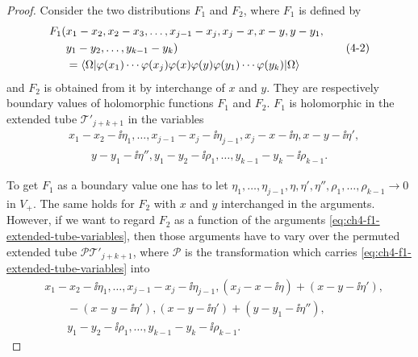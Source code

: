 \begin{proof}

Consider the two distributions $F_1$ and $F_2$, where $F_1$ is defined by
\begin{equation}
\begin{aligned}
 F_1(&x_1-x_2,x_2-x_3,\ldots,x_{j-1}-x_j,x_j-x,x-y,y-y_1,\\
      &y_1-y_2,\ldots,y_{k-1}-y_k) \\
 &=\langle \Omega\rvert\varphi(x_1)\cdots\varphi(x_j)\varphi(x)\varphi(y)
   \varphi(y_1)\cdots\varphi(y_k)\lvert \Omega\rangle
\end{aligned}
\tag{4-2}\label{eq:ch4-f1-definition}
\end{equation}
and $F_2$ is obtained from it by interchange of $x$ and $y$. They are
respectively boundary values of holomorphic functions $F_1$ and $F_2$.
$F_1$ is holomorphic in the extended tube $\mathcal{T}'_{j+k+1}$ in the
variables
\begin{equation}
\begin{aligned}
 &x_1-x_2-\ii\eta_1,\ldots,x_{j-1}-x_j-\ii\eta_{j-1},
   x_j-x-\ii\eta,x-y-\ii\eta',\\
 &\qquad y-y_1-\ii\eta'',y_1-y_2-\ii\rho_1,\ldots,
   y_{k-1}-y_k-\ii\rho_{k-1} .
\end{aligned}
\tag{4-3}\label{eq:ch4-f1-extended-tube-variables}
\end{equation}

To get $F_1$ as a boundary value one has to let
$\eta_1,\ldots,\eta_{j-1},\eta,\eta',\eta'',\rho_1,\ldots,\rho_{k-1}
\longrightarrow0$ in $V_+$. The same holds for $F_2$ with $x$ and $y$
interchanged in the arguments. However, if we want to regard $F_2$ as a
function of the arguments \eqref{eq:ch4-f1-extended-tube-variables}, then those arguments have to vary over the
permuted extended tube $\mathcal{P}\mathcal{T}'_{j+k+1}$, where $\mathcal{P}$
is the transformation which carries \eqref{eq:ch4-f1-extended-tube-variables} into
\begin{equation}
\begin{aligned}
 &x_1-x_2-\ii\eta_1,\ldots,x_{j-1}-x_j-\ii\eta_{j-1},
   (x_j-x-\ii\eta)+(x-y-\ii\eta'),\\
 &\qquad -(x-y-\ii\eta'),
   (x-y-\ii\eta')+(y-y_1-\ii\eta''),\\
 &\qquad y_1-y_2-\ii\rho_1,\ldots,y_{k-1}-y_k-\ii\rho_{k-1} .
\end{aligned}
\tag{4-4}\label{eq:ch4-permuted-tube-transformation}
\end{equation}


\end{proof}
